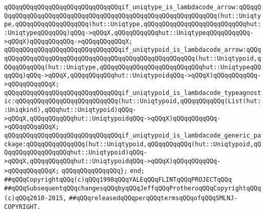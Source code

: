 \verb|qQQqqQQqqQQqqQQqqQQqqQQqqQQqqQQqif_uniqtype_is_lambdacode_arrow:qQQqqQQqqQQqqQQqqQQqqQQqqQQqqQQqqQQqqQQqqQQqqQQqqQQqqQQqqQQqqQQq(hut::Uniqtype,qQQqqQQqqQQqqQQqqQQq(hut::Uniqtype,qQQqqQQqqQQqqQQqqQQqqQQqqQQqhut::UniqtypeqQQqqQQq)qQQq->qQQqX,qQQqqQQqqQQqhut::UniqtypeqQQqqQQqqQQq->qQQqX)qQQqqQQqqQQq->qQQqqQQqqQQqX;|\newline
\verb|qQQqqQQqqQQqqQQqqQQqqQQqqQQqqQQqif_uniqtypoid_is_lambdacode_arrow:qQQqqQQqqQQqqQQqqQQqqQQqqQQqqQQqqQQqqQQqqQQqqQQqqQQqqQQq(hut::Uniqtypoid,qQQqqQQqqQQq(hut::Uniqtype,qQQqqQQqqQQqqQQqqQQqqQQqqQQqhut::UniqtypeqQQqqQQq)qQQq->qQQqX,qQQqqQQqqQQqhut::UniqtypoidqQQq->qQQqX)qQQqqQQqqQQq->qQQqqQQqqQQqX;|\newline
\verb|qQQqqQQqqQQqqQQqqQQqqQQqqQQqqQQqif_uniqtypoid_is_lambdacode_typeagnostic:qQQqqQQqqQQqqQQqqQQqqQQqqQQq(hut::Uniqtypoid,qQQqqQQqqQQq(List(hut::Uniqkind),qQQqhut::Uniqtypoid)qQQq->qQQqX,qQQqqQQqqQQqhut::UniqtypoidqQQq->qQQqX)qQQqqQQqqQQq->qQQqqQQqqQQqX;|\newline
\verb|qQQqqQQqqQQqqQQqqQQqqQQqqQQqqQQqif_uniqtypoid_is_lambdacode_generic_package:qQQqqQQqqQQqqQQq(hut::Uniqtypoid,qQQqqQQqqQQq(hut::Uniqtypoid,qQQqqQQqqQQqqQQqqQQqhut::Uniqtypoid)qQQq->qQQqX,qQQqqQQqqQQqhut::UniqtypoidqQQq->qQQqX)qQQqqQQqqQQq->qQQqqQQqqQQqX;|\newline
\verb|qQQqqQQqqQQqqQQq};|\newline
\verb|end;|\newline
\newline
\verb|##qQQqCopyrightqQQq(c)qQQq1998qQQqYALEqQQqFLINTqQQqPROJECTqQQq|\newline
\verb|##qQQqSubsequentqQQqchangesqQQqbyqQQqJeffqQQqProtheroqQQqCopyrightqQQq(c)qQQq2010-2015,|\newline
\verb|##qQQqreleasedqQQqperqQQqtermsqQQqofqQQqSMLNJ-COPYRIGHT.|\newline

